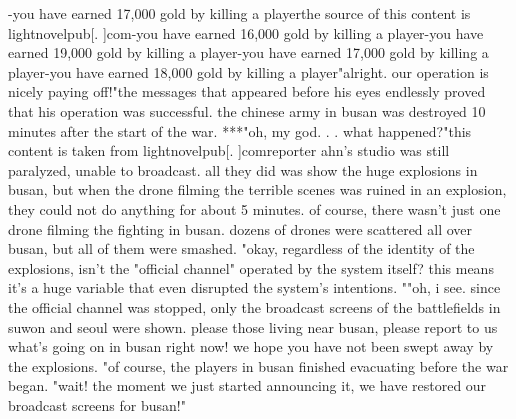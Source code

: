 -you have earned 17,000 gold by killing a playerthe source of this content is lightnovelpub[.
]com-you have earned 16,000 gold by killing a player-you have earned 19,000 gold by killing a player-you have earned 17,000 gold by killing a player-you have earned 18,000 gold by killing a player"alright.
 our operation is nicely paying off!"the messages that appeared before his eyes endlessly proved that his operation was successful.
the chinese army in busan was destroyed 10 minutes after the start of the war.
***"oh, my god.
.
.
what happened?"this content is taken from lightnovelpub[.
]comreporter ahn's studio was still paralyzed, unable to broadcast.
 all they did was show the huge explosions in busan, but when the drone filming the terrible scenes was ruined in an explosion, they could not do anything for about 5 minutes.
 of course, there wasn't just one drone filming the fighting in busan.
 dozens of drones were scattered all over busan, but all of them were smashed.
"okay, regardless of the identity of the explosions, isn't the "official channel" operated by the system itself? this means it's a huge variable that even disrupted the system's intentions.
""oh, i see.
 since the official channel was stopped, only the broadcast screens of the battlefields in suwon and seoul were shown.
 please those living near busan, please report to us what's going on in busan right now! we hope you have not been swept away by the explosions.
"of course, the players in busan finished evacuating before the war began.
"wait! the moment we just started announcing it, we have restored our broadcast screens for busan!"

 